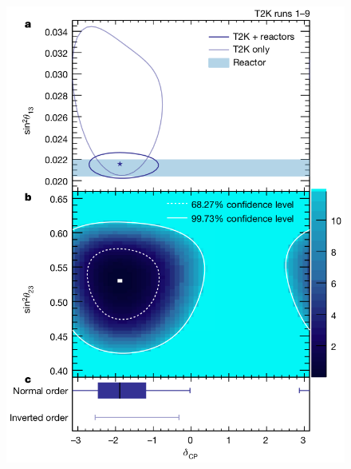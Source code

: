 \begin{figure}[h]
	\begin{minipage}[t]{.49\linewidth}
		\centering
		\includegraphics[width=\linewidth]{files/figures/theory/t2kDelta}
	\end{minipage}
	\hfill
	\begin{minipage}[t]{.49\linewidth}
		\centering

\end{minipage}
\end{figure}
